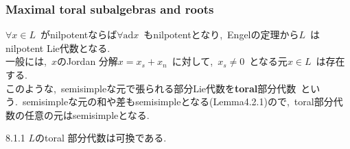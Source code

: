\documentclass[uplatex,dvipdfmx]{jsarticle}
\begin{document}
\subsubsection{Maximal toral subalgebras and roots}
$\forall x \in L$~がnilpotentならば$\forall \text{ad}x$~もnilpotentとなり,~Engelの定理から$L$~はnilpotent Lie代数となる.\\
一般には,~$x$のJordan 分解$x = x_s + x_n$~に対して,~$x_s \neq 0$~となる元$x \in L$~は存在する.\\
このような,~semisimpleな元で張られる部分Lie代数を\textbf{toral}部分代数~という.~semisimpleな元の和や差もsemisimpleとなる(Lemma4.2.1)ので,~toral部分代数の任意の元はsemisimpleとなる.\\
\begin{mylemma}{8.1.1}
    $L$のtoral 部分代数は可換である.
\end{mylemma}
\end{document}
